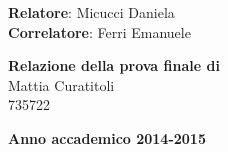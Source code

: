 \begin{titlepage}
\vspace*{1cm}
\begin{flushleft}
	{\large \textbf{Relatore}: Micucci Daniela} \\[0.4cm]
	{\large \textbf{Correlatore}: Ferri Emanuele} \\[0.4cm]
\end{flushleft}

\vspace*{1cm}
\begin{flushright}
	{\large \textbf{Relazione della prova finale di}} \\[0.4cm]
	{\large Mattia Curatitoli} \\[0.2cm]
	{\large 735722} \\
\end{flushright}

\vfill
\begin{center}
	{\large \textbf{Anno accademico 2014-2015}}
	\vspace*{1.5cm}
\end{center}

\end{titlepage}

\restoregeometry	
